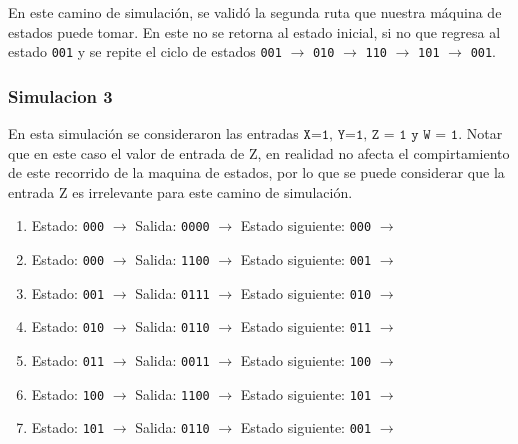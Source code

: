 \documentclass[12pt, letterpaper]{article}
\begin{document}
En este camino de simulación, se validó la segunda ruta que nuestra máquina de estados puede tomar. En este no se retorna al estado inicial, si no que regresa al estado \texttt{001} y se repite el ciclo de estados \texttt{001} $\rightarrow$ \texttt{010} $\rightarrow$ \texttt{110} $\rightarrow$ \texttt{101} $\rightarrow$ \texttt{001}.

\subsubsection*{Simulacion 3}

En esta simulación se consideraron las entradas \(\texttt{X=1, Y=1, Z = 1 y W = 1}\). Notar que en este caso el valor de entrada de Z, en realidad no afecta el compirtamiento de este recorrido de la maquina de estados, por lo que se puede considerar que la entrada Z es irrelevante para este camino de simulación.

\begin{enumerate}
    \item[\textcolor{red}{sec-1:}] Estado: \texttt{000} \(\rightarrow\) Salida: \texttt{0000} \(\rightarrow\) Estado siguiente: \texttt{000} \(\rightarrow\)
    \item[\textcolor{red}{sec-2:}] Estado: \texttt{000} \(\rightarrow\) Salida: \texttt{1100} \(\rightarrow\) Estado siguiente: \texttt{001} \(\rightarrow\)
    \item[\textcolor{red}{sec-3:}] Estado: \texttt{001} \(\rightarrow\) Salida: \texttt{0111} \(\rightarrow\) Estado siguiente: \texttt{010} \(\rightarrow\)
    \item[\textcolor{red}{sec-4:}] Estado: \texttt{010} \(\rightarrow\) Salida: \texttt{0110} \(\rightarrow\) Estado siguiente: \texttt{011} \(\rightarrow\)
    \item[\textcolor{red}{sec-5:}] Estado: \texttt{011} \(\rightarrow\) Salida: \texttt{0011} \(\rightarrow\) Estado siguiente: \texttt{100} \(\rightarrow\)
    \item[\textcolor{red}{sec-6:}] Estado: \texttt{100} \(\rightarrow\) Salida: \texttt{1100} \(\rightarrow\) Estado siguiente: \texttt{101} \(\rightarrow\)
    \item[\textcolor{red}{sec-7:}] Estado: \texttt{101} \(\rightarrow\) Salida: \texttt{0110} \(\rightarrow\) Estado siguiente: \texttt{001} \(\rightarrow\)
\end{enumerate}
\end{document}

